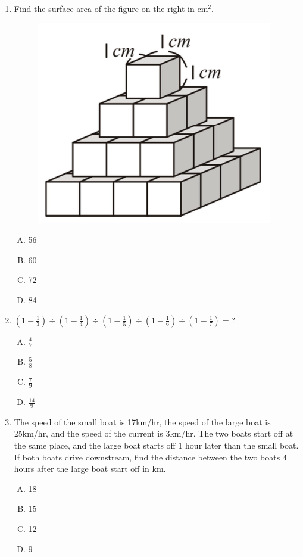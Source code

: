 \documentclass[11pt]{scrartcl}
\begin{document}
\begin{enumerate}
\newpage
\item Find the surface area of the figure on the right in cm$^2$.
\begin{figure}[h]
    \centering
    \includegraphics{StarGen/0Figure/wmi-2020-6a-pyramid-of-cubes.png}
\end{figure}
\begin{enumerate}[(A)]
    \item 56 \item 60 \item 72 \item 84
\end{enumerate}

\item $(1 - \frac{1}{3}) \div (1 - \frac{1}{4}) \div (1 - \frac{1}{5}) \div (1 - \frac{1}{6}) \div (1 - \frac{1}{7}) = ?$
\begin{enumerate}[(A)]
    \item $\frac{4}{7}$ \item $\frac{5}{8}$ \item $\frac{7}{9}$ \item $\frac{14}{9}$
\end{enumerate}

\item The speed of the small boat is 17km/hr, the speed of the large boat is 25km/hr, and the speed of the current is 3km/hr. The two boats start off at the same place, and the large boat starts off 1 hour later than the small boat. If both boats drive downstream, find the distance between the two boats 4 hours after the large boat start off in km.
\begin{enumerate}[(A)]
    \item 18 \item 15 \item 12 \item 9
\end{enumerate}


\end{enumerate}
\end{document}
